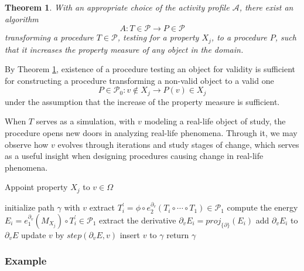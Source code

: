 \documentclass[smallcondensed]{svjour3}
\newcommand{\dP}{\mathcal{P}}
\newcommand{\D}{\partial}
\newtheorem{izrek}{Theorem}[section]
\begin{document}
      \begin{izrek}\label{izr:algA}
           With an appropriate choice of the activity profile $\mathcal{A}$, there exist an algorithm
           \begin{equation}\label{eq:algA1}
             A:T\in\dP\to P\in\dP
             \end{equation}
             transforming a procedure $T\in\dP$, testing for a property $X_j$, to a procedure $P$, such that it increases the property measure of any object in the domain. 
           \end{izrek}
           \begin{corollary}
              By Theorem \ref{izr:algA}, existence of a procedure testing an object for validity is sufficient for constructing a procedure transforming a non-valid object to a valid one
              $$P\in \dP_0:v\notin X_j\to P(v)\in X_j$$
              under the assumption that the increase of the property measure is sufficient.
              \end{corollary}
              
    When $T$ serves as a simulation, with $v$ modeling a real-life object of study, the procedure opens new doors in analyzing real-life phenomena. Through it, we may observe how $v$ evolves through iterations and study stages of change, which serves as a useful insight when designing procedures causing change in real-life phenomena.          
   
   \begin{algorithm}[H]
   \caption{Appoint property $X_j$ to $v\in \Omega$}
   \label{alg:appoint}
   \begin{algorithmic}[1]
   \State initialize path $\gamma$ with $v$
   \State extract $T^\prime_i=\phi\circ e^{\D_{v}}_2(T_i\circ\cdots\circ T_1)\in\dP_1$
   \State compute the energy $E_i=e^{\D_v}_1(M_{X_j})\circ T^\prime_i\in\dP_1$
   \State extract the derivative $\D_v E_i=proj_{\{\D\}}(E_i)$
   \State add $\D_v E_i$ to $\D_v E$
   \EndFor
   \State update $v$ by $step(\D_v E,v)$
   \State insert $v$ to $\gamma$
   \EndFor
   \State return $\gamma$
   \EndProcedure
   \end{algorithmic}
   \end{algorithm}

   
   \subsubsection{Example}
   
\end{document}
